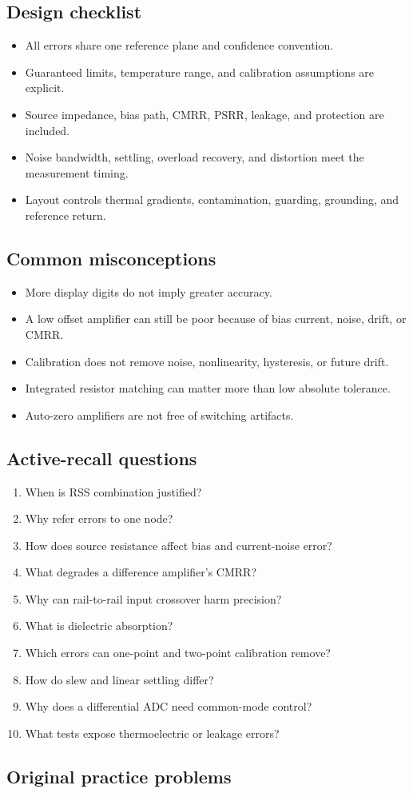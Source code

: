 \documentclass[10pt,letterpaper]{article}
\begin{document}
\subsection{Design checklist}
\begin{itemize}
  \item All errors share one reference plane and confidence convention.
  \item Guaranteed limits, temperature range, and calibration assumptions are explicit.
  \item Source impedance, bias path, CMRR, PSRR, leakage, and protection are included.
  \item Noise bandwidth, settling, overload recovery, and distortion meet the measurement timing.
  \item Layout controls thermal gradients, contamination, guarding, grounding, and reference return.
\end{itemize}\subsection{Common misconceptions}
\begin{itemize}
  \item More display digits do not imply greater accuracy.
  \item A low offset amplifier can still be poor because of bias current, noise, drift, or CMRR.
  \item Calibration does not remove noise, nonlinearity, hysteresis, or future drift.
  \item Integrated resistor matching can matter more than low absolute tolerance.
  \item Auto-zero amplifiers are not free of switching artifacts.
\end{itemize}\subsection{Active-recall questions}
\begin{enumerate}
  \item When is RSS combination justified?
  \item Why refer errors to one node?
  \item How does source resistance affect bias and current-noise error?
  \item What degrades a difference amplifier's CMRR?
  \item Why can rail-to-rail input crossover harm precision?
  \item What is dielectric absorption?
  \item Which errors can one-point and two-point calibration remove?
  \item How do slew and linear settling differ?
  \item Why does a differential ADC need common-mode control?
  \item What tests expose thermoelectric or leakage errors?
\end{enumerate}\subsection{Original practice problems}
\end{document}

